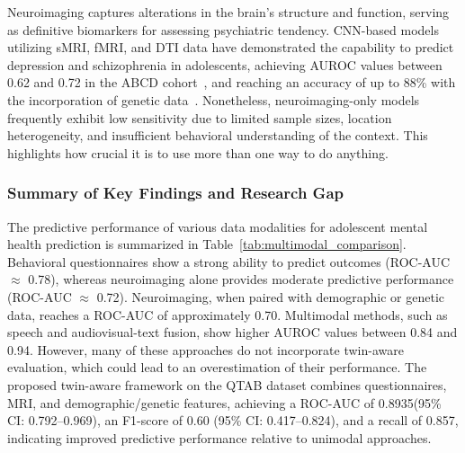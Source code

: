 \documentclass[10pt,letterpaper]{article}
\begin{document}
Neuroimaging captures alterations in the brain's structure and function, serving as definitive biomarkers for assessing psychiatric tendency. CNN-based models utilizing sMRI, fMRI, and DTI data have demonstrated the capability to predict depression and schizophrenia in adolescents, achieving AUROC values between 0.62 and 0.72 in the ABCD cohort~\cite{ref23}, and reaching an accuracy of up to 88\% with the incorporation of genetic data~\cite{ref25}. Nonetheless, neuroimaging-only models frequently exhibit low sensitivity due to limited sample sizes, location heterogeneity, and insufficient behavioral understanding of the context. This highlights how crucial it is to use more than one way to do anything.


\subsubsection*{Summary of Key Findings and Research Gap}

The predictive performance of various data modalities for adolescent mental health prediction is summarized in Table~\ref{tab:multimodal_comparison}. Behavioral questionnaires show a strong ability to predict outcomes (ROC-AUC $\approx$ 0.78), whereas neuroimaging alone provides moderate predictive performance (ROC-AUC $\approx$ 0.72). Neuroimaging, when paired with demographic or genetic data, reaches a ROC-AUC of approximately 0.70. Multimodal methods, such as speech and audiovisual-text fusion, show higher AUROC values between 0.84 and 0.94. However, many of these approaches do not incorporate twin-aware evaluation, which could lead to an overestimation of their performance. The proposed twin-aware framework on the QTAB dataset combines questionnaires, MRI, and demographic/genetic features, achieving a ROC-AUC of 0.8935(95\% CI: 0.792--0.969), an F1-score of 0.60 (95\% CI: 0.417--0.824), and a recall of 0.857, indicating improved predictive performance relative to unimodal approaches.
\end{document}
